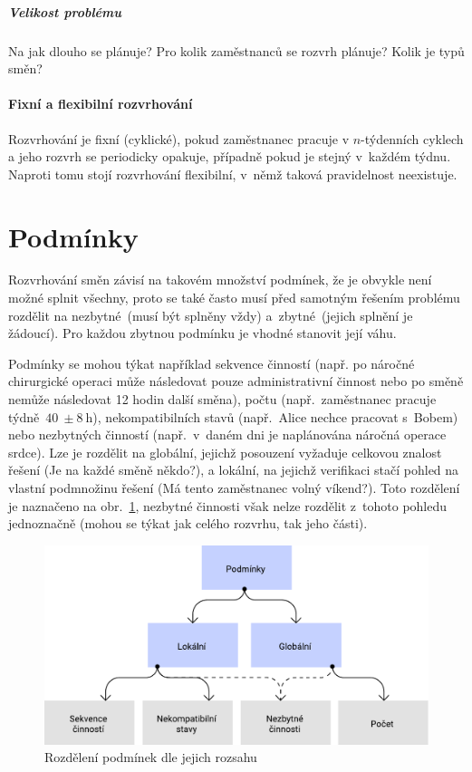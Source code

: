 \documentclass[twoside]{ctuthesis}
\begin{document}
\subparagraph{Velikost problému}
Na jak dlouho se plánuje? Pro kolik zaměstnanců se rozvrh plánuje? Kolik je typů směn?

\paragraph{Fixní a flexibilní rozvrhování}
Rozvrhování je fixní (cyklické), pokud zaměstnanec pracuje v $n$-týdenních cyklech a jeho rozvrh se periodicky opakuje, případně pokud je stejný v~každém týdnu. Naproti tomu stojí rozvrhování flexibilní, v~němž taková pravidelnost neexistuje. \cite{burke2004state}


\section{Podmínky}
\label{sec:constraints}
Rozvrhování směn závisí na takovém množství podmínek, že je obvykle není možné splnit všechny, proto se také často musí před samotným řešením problému rozdělit na nezbytné~(musí být splněny vždy) a~zbytné~(jejich splnění je žádoucí). \cite{todorovic2012bee} Pro každou zbytnou podmínku je vhodné stanovit její váhu. \cite{buyukozkan2014applicability}

Podmínky se mohou týkat například sekvence činností (např. po náročné chirurgické operaci může následovat pouze administrativní činnost nebo po směně nemůže následovat 12 hodin další směna), počtu (např.~zaměstnanec pracuje týdně~$ 40~\pm 8~\mbox{h}$), nekompatibilních stavů (např.~Alice nechce pracovat s~Bobem) nebo nezbytných činností (např.~v~daném dni je naplánována náročná operace srdce). Lze je rozdělit na globální, jejichž posouzení vyžaduje celkovou znalost řešení (Je na každé směně někdo?), a lokální, na jejichž verifikaci stačí pohled na vlastní podmnožinu řešení (Má tento zaměstnanec volný víkend?). Toto rozdělení je naznačeno na obr.~\ref{fig:constraints}, nezbytné činnosti však nelze rozdělit z~tohoto pohledu jednoznačně (mohou se týkat jak celého rozvrhu, tak jeho části). \cite{blochliger2004modeling}

\begin{figure}[h]
	\includegraphics[scale=0.7]{img/constraints.pdf}
	\caption{Rozdělení podmínek dle jejich rozsahu}
	\label{fig:constraints}
\end{figure}
\end{document}
